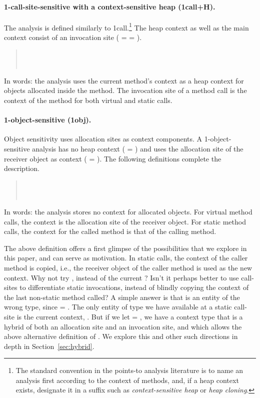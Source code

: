 \paragraph{1-call-site-sensitive with a context-sensitive
heap (1call+H).} The analysis is defined similarly to
1call.\footnote{The standard convention in the points-to analysis
literature is to name an analysis first according to the context of
methods, and, if a heap context exists, designate it in a suffix such
as \emph{context-sensitive heap} or \emph{heap cloning}.}  The heap
context as well as the main context consist of an invocation site
( =  = ).
\begin{quote}
 \\
 \\
\end{quote}
In words: the analysis uses the current method's context as a heap
context for objects allocated inside the method. The invocation site
of a method call is the context of the method for both virtual and
static calls.

\paragraph{1-object-sensitive (1obj).}
Object sensitivity uses allocation sites as context components. A
1-object-sensitive analysis has no heap context ( =
\args{\{$\star$\}}) and uses the allocation site of the receiver
object as context ( = ). The following definitions
complete the description. 
\begin{quote}
 \\
 \\
\end{quote}
In words: the analysis stores no context for allocated objects. For
virtual method calls, the context is the allocation site of the
receiver object. For static method calls, the context for the called
method is that of the calling method.

The above definition offers a first glimpse of the possibilities that
we explore in this paper, and can serve as motivation. In static
calls, the context of the caller method is copied, i.e., the receiver
object of the caller method is used as the new context. Why not try
, instead of the current
?  Isn't it perhaps better to use
call-sites to differentiate static invocations, instead of blindly
copying the context of the last non-static method called? A simple
answer is that  is an entity of the wrong type, since
 = . The only entity of type  we have
available at a static call-site is the current context, .
But if we let  = , we have a context type
that is a hybrid of both an allocation site and an invocation site,
and which allows the above alternative definition of
. We explore this and other such directions in
depth in Section~\ref{sec:hybrid}.


